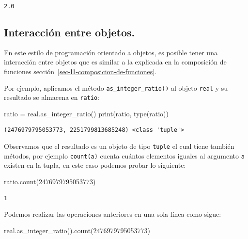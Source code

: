 \documentclass[
  spanish,
  letterpaper,
]{scrbook}
\newenvironment{Shaded}{\begin{snugshade}}{\end{snugshade}}
\newcommand{\BuiltInTok}[1]{\textcolor[rgb]{0.00,0.23,0.31}{#1}}
\newcommand{\DecValTok}[1]{\textcolor[rgb]{0.68,0.00,0.00}{#1}}
\newcommand{\NormalTok}[1]{\textcolor[rgb]{0.00,0.23,0.31}{#1}}
\newcommand{\OperatorTok}[1]{\textcolor[rgb]{0.37,0.37,0.37}{#1}}
\theoremstyle{definition}
\theoremstyle{remark}
\begin{document}
\begin{verbatim}
2.0
\end{verbatim}

\subsection{Interacción entre
objetos.}\label{interacciuxf3n-entre-objetos.}

En este estilo de programación orientado a objetos, es posible tener una
interacción entre objetos que es similar a la explicada en la
composición de funciones sección~\ref{sec-l1-composicion-de-funciones}.

Por ejemplo, aplicamos el método \texttt{as\_integer\_ratio()} al objeto
\texttt{real} y su resultado se almacena en \texttt{ratio}:~

\begin{Shaded}
\begin{Highlighting}[]
\NormalTok{ratio }\OperatorTok{=}\NormalTok{ real.as\_integer\_ratio()}
\BuiltInTok{print}\NormalTok{(ratio, }\BuiltInTok{type}\NormalTok{(ratio))}
\end{Highlighting}
\end{Shaded}

\begin{verbatim}
(2476979795053773, 2251799813685248) <class 'tuple'>
\end{verbatim}

Observamos que el resultado es un objeto de tipo \texttt{tuple} el cual
tiene también métodos, por ejemplo \texttt{count(a)} cuenta cuántos
elementos iguales al argumento \texttt{a} existen en la tupla, en este
caso podemos probar lo siguiente:

\begin{Shaded}
\begin{Highlighting}[]
\NormalTok{ratio.count(}\DecValTok{2476979795053773}\NormalTok{)}
\end{Highlighting}
\end{Shaded}

\begin{verbatim}
1
\end{verbatim}

Podemos realizar las operaciones anteriores en una sola línea como
sigue:

\begin{Shaded}
\begin{Highlighting}[]
\NormalTok{real.as\_integer\_ratio().count(}\DecValTok{2476979795053773}\NormalTok{)}
\end{Highlighting}
\end{Shaded}
\end{document}

